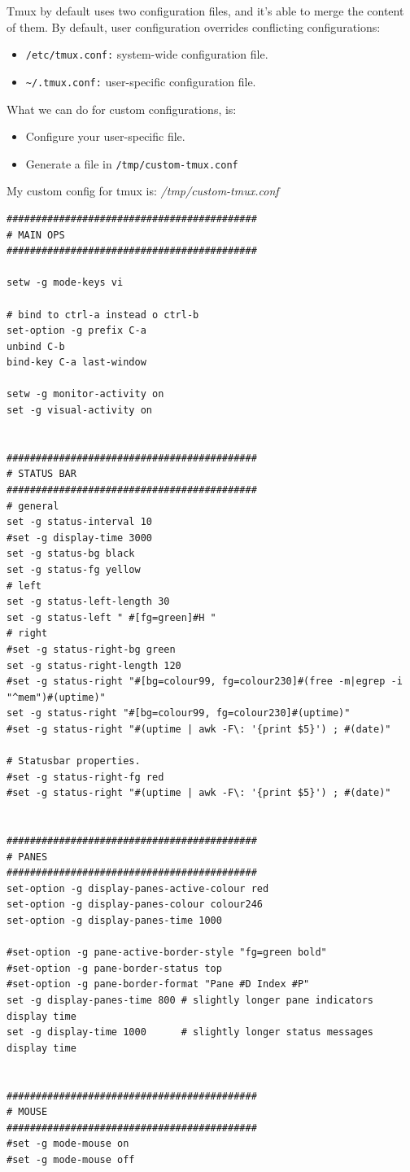 \documentclass{article}
\newenvironment{codetemplate}[1][]{%
  \mybasecolorbox[#1]
  \itshape
}{%
  \endmybasecolorbox
}
\begin{document}
Tmux by default uses two configuration files, and it's able to merge the content of them. By default, user configuration overrides conflicting configurations:
\begin{itemize}
    \item \verb|/etc/tmux.conf:| system-wide configuration file.
    \item \verb|~/.tmux.conf:| user-specific configuration file.
\end{itemize}

What we can do for custom configurations, is:
\begin{itemize}
    \item Configure your user-specific file.
    \item Generate a file in \verb|/tmp/custom-tmux.conf|
\end{itemize}

My custom config for tmux is:
\begin{codetemplate}{/tmp/custom-tmux.conf}
\begin{verbatim}
###########################################
# MAIN OPS
###########################################

setw -g mode-keys vi

# bind to ctrl-a instead o ctrl-b
set-option -g prefix C-a
unbind C-b
bind-key C-a last-window

setw -g monitor-activity on
set -g visual-activity on


###########################################
# STATUS BAR
###########################################
# general
set -g status-interval 10
#set -g display-time 3000
set -g status-bg black
set -g status-fg yellow
# left
set -g status-left-length 30
set -g status-left " #[fg=green]#H "
# right
#set -g status-right-bg green
set -g status-right-length 120
#set -g status-right "#[bg=colour99, fg=colour230]#(free -m|egrep -i "^mem")#(uptime)"
set -g status-right "#[bg=colour99, fg=colour230]#(uptime)"
#set -g status-right "#(uptime | awk -F\: '{print $5}') ; #(date)"

# Statusbar properties.
#set -g status-right-fg red
#set -g status-right "#(uptime | awk -F\: '{print $5}') ; #(date)"


###########################################
# PANES
###########################################
set-option -g display-panes-active-colour red
set-option -g display-panes-colour colour246
set-option -g display-panes-time 1000

#set-option -g pane-active-border-style "fg=green bold"
#set-option -g pane-border-status top
#set-option -g pane-border-format "Pane #D Index #P"
set -g display-panes-time 800 # slightly longer pane indicators display time
set -g display-time 1000      # slightly longer status messages display time


###########################################
# MOUSE
###########################################
#set -g mode-mouse on
#set -g mode-mouse off
\end{verbatim}
\end{codetemplate}
\end{document}
